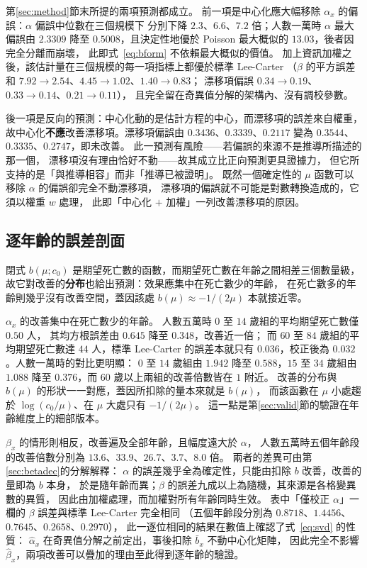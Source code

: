 \documentclass[UTF8, fontset=macnew, a4paper, 12pt]{ctexart}
\begin{document}
第\ref{sec:method}節末所提的兩項預測都成立。
前一項是中心化應大幅移除 $\alpha_x$ 的偏誤：$\alpha$ 偏誤中位數在三個規模下
分別下降 $2.3$、$6.6$、$7.2$ 倍；人數一萬時 $\alpha$ 最大偏誤由 $2.3309$ 降至
$0.5008$，且決定性地優於 Poisson 最大概似的 $13.03$，後者因完全分離而崩壞，
此即式~\eqref{eq:bform} 不依賴最大概似的價值。
加上資訊加權之後，該估計量在三個規模的每一項指標上都優於標準 Lee-Carter
（$\beta$ 的平方誤差和 $7.92\to2.54$、$4.45\to1.02$、$1.40\to0.83$；
漂移項偏誤 $0.34\to0.19$、$0.33\to0.14$、$0.21\to0.11$），
且完全留在奇異值分解的架構內、沒有調校參數。

後一項是反向的預測：中心化動的是估計方程的中心，而漂移項的誤差來自權重，
故中心化\textbf{不應}改善漂移項。漂移項偏誤由 $0.3436$、$0.3339$、$0.2117$
變為 $0.3544$、$0.3335$、$0.2747$，即未改善。
此一預測有風險——若偏誤的來源不是推導所描述的那一個，
漂移項沒有理由恰好不動——故其成立比正向預測更具證據力，
但它所支持的是「與推導相容」而非「推導已被證明」。
既然一個確定性的 $\mu$ 函數可以移除 $\alpha$ 的偏誤卻完全不動漂移項，
漂移項的偏誤就不可能是對數轉換造成的，它須以權重 $w$ 處理，
此即「中心化 $+$ 加權」一列改善漂移項的原因。

\subsection{逐年齡的誤差剖面}\label{sec:ageprof}

閉式 $b(\mu;c_0)$ 是期望死亡數的函數，而期望死亡數在年齡之間相差三個數量級，
故它對改善的\textbf{分布}也給出預測：效果應集中在死亡數少的年齡，
在死亡數多的年齡則幾乎沒有改善空間，蓋因該處 $b(\mu)\approx-1/(2\mu)$
本就接近零。

$\alpha_x$ 的改善集中在死亡數少的年齡。
人數五萬時 $0$ 至 $14$ 歲組的平均期望死亡數僅 $0.50$ 人，
其均方根誤差由 $0.645$ 降至 $0.348$，改善近一倍；
而 $60$ 至 $84$ 歲組的平均期望死亡數達 $44$ 人，標準 Lee-Carter 的誤差本就只有
$0.036$，校正後為 $0.032$。人數一萬時的對比更明顯：
$0$ 至 $14$ 歲組由 $1.942$ 降至 $0.588$，$15$ 至 $34$ 歲組由 $1.088$ 降至
$0.376$，而 $60$ 歲以上兩組的改善倍數皆在 $1$ 附近。
改善的分布與 $b(\mu)$ 的形狀一一對應，蓋因所扣除的量本來就是 $b(\mu)$，
而該函數在 $\mu$ 小處趨於 $\log(c_0/\mu)$、在 $\mu$ 大處只有 $-1/(2\mu)$。
這一點是第\ref{sec:valid}節的驗證在年齡維度上的細部版本。

$\beta_x$ 的情形則相反，改善遍及全部年齡，且幅度遠大於 $\alpha$，
人數五萬時五個年齡段的改善倍數分別為 $13.6$、$33.9$、$26.7$、$3.7$、$8.0$ 倍。
兩者的差異可由第\ref{sec:betadec}的分解解釋：
$\alpha$ 的誤差幾乎全為確定性，只能由扣除 $b$ 改善，改善的量即為 $b$ 本身，
於是隨年齡而異；$\beta$ 的誤差九成以上為隨機，其來源是各格變異數的異質，
因此由加權處理，而加權對所有年齡同時生效。
表中「僅校正 $\alpha$」一欄的 $\beta$ 誤差與標準 Lee-Carter 完全相同
（五個年齡段分別為 $0.8718$、$1.4456$、$0.7645$、$0.2658$、$0.2970$），
此一逐位相同的結果在數值上確認了式~\eqref{eq:svd} 的性質：
$\hat\alpha_x$ 在奇異值分解之前定出，事後扣除 $\bar b_x$ 不動中心化矩陣，
因此完全不影響 $\hat\beta_x$，兩項改善可以疊加的理由至此得到逐年齡的驗證。
\end{document}
